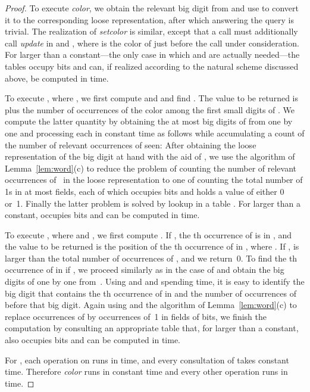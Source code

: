 \documentclass[envcountsame,envcountsect,undated,nolinenumbers]{lnthi}
\def\Tvn#1{\hbox{\textit{#1\/}}}
\begin{document}
\begin{proof}
To execute \Tvn{color}, we obtain the
relevant big digit from  and use 
to convert it to the corresponding loose
representation, after which answering
the query is trivial.
The realization of \Tvn{setcolor} is similar,
except that a call 
must additionally call \Tvn{update} in
 and , where  is the color
of  just before the call under consideration.
For  larger than a constant---the only case
in which  and  are
actually needed---the tables occupy
 bits
and can, if realized according to
the natural scheme discussed above, be computed in  time.

To execute ,
where
,
we first compute  and
 and find .
The value to be returned is
 plus the number
of occurrences
of the color  among the  first small digits
of .
We compute the latter quantity by obtaining
the at most  big digits of  from  one
by one
and processing each in constant time as follows while
accumulating a count of the number of
relevant occurrences of  seen:
After obtaining the loose representation of the
big digit at hand with the aid of ,
we use the algorithm of
Lemma~\ref{lem:word}(c) to reduce the problem
of counting the number of relevant occurrences
of~ in the loose representation
to one of counting the total number of
1s in at most  fields,
each of which occupies  bits
and holds a value of either 0 or~1.
Finally the latter problem is solved
by lookup in a table .
For  larger than a constant,
 occupies
 bits
and can be computed in  time.

To execute , where  and
,
we first compute .
If ,
the th occurrence of  is in ,
and the value to be returned is the position
of the th occurrence of  in ,
where .
If ,  is larger than the total number
of occurrences of , and we return~0.
To find the th occurrence of 
in  if , we proceed similarly
as in the case of  and
obtain the big digits of  one by one
from~.
Using  and  and spending
 time, it is easy
to identify the big digit that contains the
th occurrence of  in  and the number of
occurrences of  before that big digit.
Again using 
and the algorithm of Lemma~\ref{lem:word}(c)
to replace occurrences of  by occurrences
of~1 in fields of  bits,
we finish the computation by consulting an
appropriate table  that,
for  larger than a constant,
also occupies  bits
and can be computed in  time.

For ,
each operation on  runs in
 time, 
and every consultation of 
takes constant time.
Therefore \Tvn{color} runs in constant time
and every other operation
runs in  time.
\end{proof}
\end{document}
